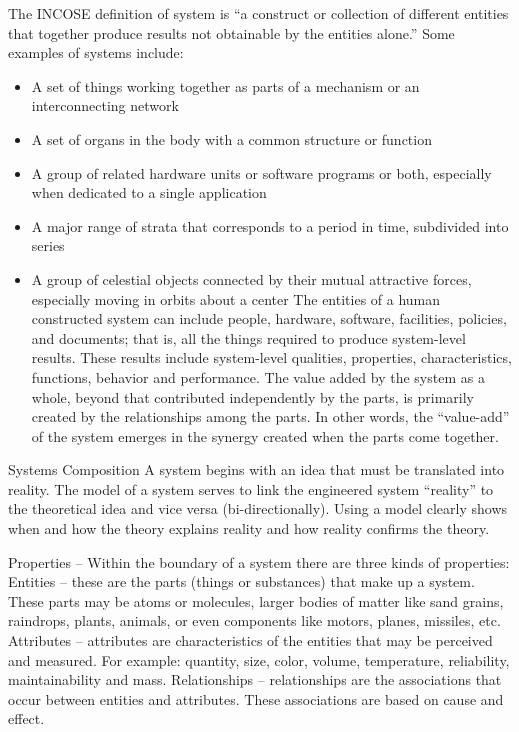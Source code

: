 The INCOSE definition of system is ``a construct or collection of different entities that together produce results not obtainable by the entities alone.''  Some examples of systems include:

\begin{itemize}
\item A set of things working together as parts of a mechanism or an interconnecting network
\item A set of organs in the body with a common structure or function
\item A group of related hardware units or software programs or both, especially when dedicated to a single application
\item A major range of strata that corresponds to a period in time, subdivided into series
\item A group of celestial objects connected by their mutual attractive forces, especially moving in orbits about a center
The entities of a human constructed system can include people, hardware, software, facilities, policies, and documents; that is, all the things required to produce system-level results. These results include system-level qualities, properties, characteristics, functions, behavior and performance. The value added by the system as a whole, beyond that contributed independently by the parts, is primarily created by the relationships among the parts. In other words, the ``value-add'' of the system emerges in the synergy created when the parts come together.
\end{itemize}

Systems Composition
A system begins with an idea that must be translated into reality. The model of a system serves to link the engineered system “reality” to the theoretical idea and vice versa (bi-directionally). Using a model clearly shows when and how the theory explains reality and how reality confirms the theory. 

Properties – Within the boundary of a system there are three kinds of properties:
Entities – these are the parts (things or substances) that make up a system. These parts may be atoms or molecules, larger bodies of matter like sand grains, raindrops, plants, animals, or even components like motors, planes, missiles, etc.
Attributes – attributes are characteristics of the entities that may be perceived and measured. For example: quantity, size, color, volume, temperature, reliability, maintainability and mass.
Relationships – relationships are the associations that occur between entities and attributes. These associations are based on cause and effect. 

